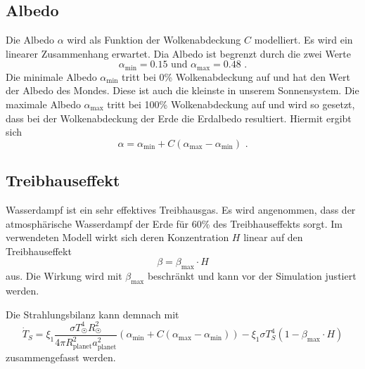 \begin{refsection}
\subsection{Albedo}
Die Albedo $\alpha$ wird als Funktion der Wolkenabdeckung $C$ modelliert. Es wird ein linearer Zusammenhang erwartet. Dia Albedo ist begrenzt durch die zwei Werte
\begin{equation}
\alpha_{\text{min}} = 0.15 \text{ und } \alpha_{\text{max}} = 0.48 \text{ .}
\end{equation}
Die minimale Albedo $\alpha_{\text{min}}$ tritt bei 0\% Wolkenabdeckung auf und hat den Wert der Albedo des Mondes. Diese ist auch die kleinste in unserem Sonnensystem. Die maximale Albedo $\alpha_{\text{max}}$ tritt bei 100\% Wolkenabdeckung auf und wird so gesetzt, dass bei der Wolkenabdeckung der Erde die Erdalbedo resultiert. Hiermit ergibt sich
\begin{equation}
\alpha = \alpha_{\text{min}} + C(\alpha_{\text{max}} - \alpha_{\text{min}}) \text{ .}
\end{equation}

\subsection{Treibhauseffekt}
Wasserdampf ist ein sehr effektives Treibhausgas. Es wird angenommen, dass der atmosphärische Wasserdampf der Erde für 60\% des Treibhauseffekts sorgt. \cite{planeten:treibhauseffekt}  
Im verwendeten Modell wirkt sich deren Konzentration $H$ linear auf den Treibhauseffekt 
\begin{equation}
\beta  = \beta_{\text{max}} \cdot H
\end{equation}
aus. Die Wirkung wird mit $\beta_{\text{max}}$ beschränkt und kann vor der Simulation justiert werden.

Die Strahlungsbilanz kann demnach mit
\begin{equation}
\dot{T}_S = \xi_1 \frac{\sigma T_{\astrosun}^4 R_{\astrosun}^2}{4 \pi R_{\text{planet}}^2 a_{\text{planet}}^2} (\alpha_{\text{min}} + C(\alpha_{\text{max}} - \alpha_{\text{min}})) - \xi_1 \sigma T_{S}^4  (1 - \beta_{\text{max}} \cdot H)
\end{equation}
zusammengefasst werden.


\end{refsection}
